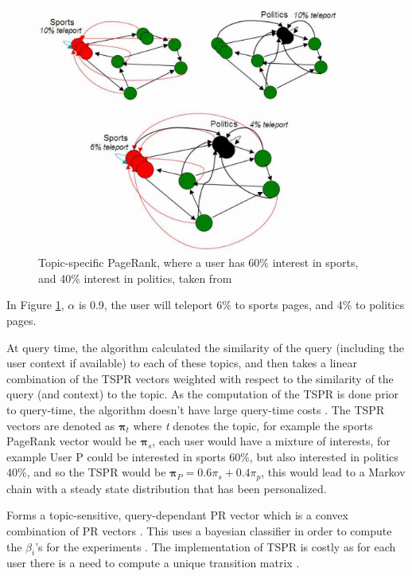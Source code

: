\documentclass[11pt]{report}
\begin{document}
{\begin{figure}[h!]
\centering
\includegraphics[width=10cm]{Topic-specific_PageRank_Manning.png}
\caption{Topic-specific PageRank, where a user has 60\% interest in sports, and 40\% interest in politics, taken from \cite{manning}}
\label{fig:topic-specific}
\end{figure}

In Figure \ref{fig:topic-specific}, $\alpha$ is 0.9, the user will teleport 6\% to sports pages, and 4\% to politics pages.

At query time, the algorithm calculated the similarity of the query (including the user context if available) to each of these topics, and then takes a linear combination of the TSPR vectors weighted with respect to the similarity of the query (and context) to the topic. As the computation of the TSPR is done prior to query-time, the algorithm doesn't have large query-time costs \cite{haveliwala2002topic}.  The TSPR vectors are denoted as $\boldsymbol{\pi}_t$ where \textit{t} denotes the topic, for example the sports PageRank vector would be $\boldsymbol{\pi}_s$, each user would have a mixture of interests, for example User P could be interested in sports 60\%, but also interested in politics 40\%, and so the TSPR would be $\boldsymbol{\pi}_P=0.6\pi_s+0.4\pi_p$, this would lead to a Markov chain with a steady state distribution that has been personalized. 

Forms a topic-sensitive, query-dependant PR vector which is a convex combination of PR vectors \cite{langville}. This uses a bayesian classifier in order to compute the $\beta_i$'s for the experiments \cite{langville}.   The implementation of TSPR is costly as for each user there is a need to compute a unique transition matrix \cite{manning}. 

}
\end{document}
